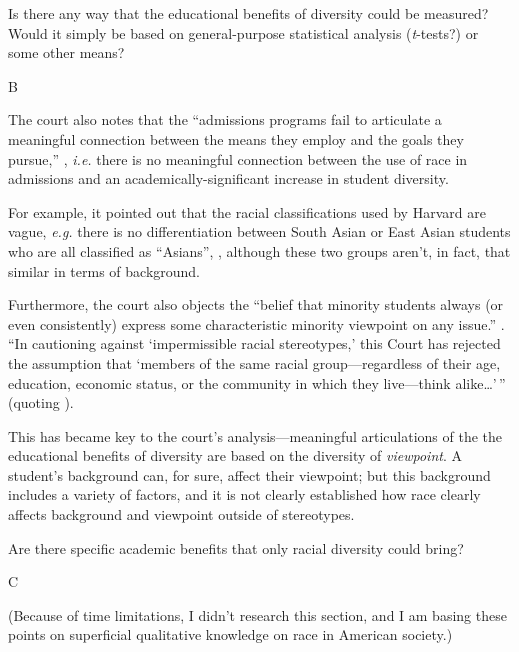 \documentclass[12pt, a4paper]{extarticle}
\newcommand{\nopage}{\_\_\_\_}
\begin{document}
Is there any way that the educational benefits of diversity could be measured? Would it simply be based on general-purpose statistical analysis (\textit{t}-tests?) or some other means?

\begin{center}
	B
\end{center}

The  court also notes that the ``admissions programs fail to articulate a meaningful connection between the means they employ and the goals they pursue,'' \Runcite[\nopage{} (slip op.\ 24)]{harvard}, \textit{i.e.} there is no meaningful connection between the use of race in admissions and an academically-significant increase in student diversity.

For example, it pointed out that the racial classifications used by Harvard are vague, \textit{e.g.} there is no differentiation between South Asian or East Asian students who are all classified as ``Asians'', \Runcite[\nopage{} (slip op.\ 24–25)]{harvard}, although these two groups aren't, in fact, that similar in terms of background.

Furthermore, the court also objects the ``belief that minority students always (or even consistently) express some characteristic minority viewpoint on any issue.'' . ``In cautioning against ‘impermissible racial stereotypes,’ this Court has rejected the assumption that ‘members of the same racial group—regardless of their age, education, economic status, or the community in which they live—think alike…'\,''  (quoting ).

This has became key to the  court's analysis—meaningful articulations of the the educational benefits of diversity are based on the diversity of \emph{viewpoint}. A student's background can, for sure, affect their viewpoint; but this background includes a variety of factors, and it is not clearly established how race clearly affects background and viewpoint outside of stereotypes.

Are there specific academic benefits that only racial diversity could bring?

\begin{center}
	C
\end{center}

(Because of time limitations, I didn't research this section, and I am basing these points on superficial qualitative knowledge on race in American society.)
\end{document}
